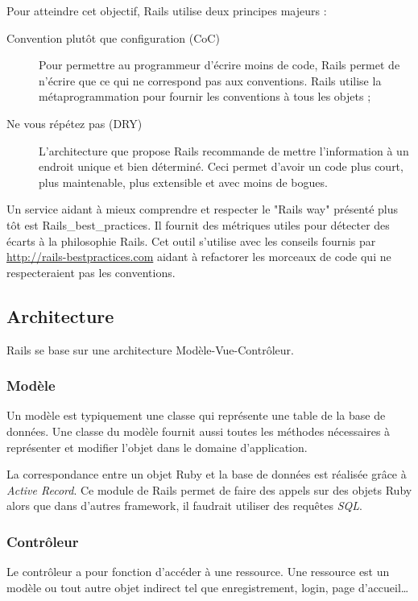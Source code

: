 Pour atteindre cet objectif, Rails utilise deux principes majeurs :
\begin{description}
  \item[Convention plutôt que configuration (CoC)] Pour permettre au programmeur d'écrire moins de code, Rails permet de n'écrire que ce qui ne correspond pas aux conventions. Rails utilise la métaprogrammation pour fournir les conventions à tous les objets ;
  \item[Ne vous répétez  pas (DRY)] L'architecture que propose Rails recommande de mettre l'information à un endroit unique et bien déterminé. Ceci permet d'avoir un code plus court, plus maintenable, plus extensible et avec moins de bogues.
\end{description}

Un service aidant à mieux comprendre et respecter le "Rails way" présenté plus tôt est Rails\_best\_practices. Il fournit des métriques utiles pour détecter des écarts à la philosophie Rails. Cet outil s'utilise avec les conseils fournis par \url{http://rails-bestpractices.com} aidant à refactorer les morceaux de code qui ne respecteraient pas les conventions.

\subsection{Architecture}
Rails se base sur une architecture Modèle-Vue-Contrôleur. %
\subsubsection{Modèle} 
Un modèle est typiquement une classe qui représente une table de la base de données. Une classe du modèle fournit aussi toutes les méthodes nécessaires à représenter et modifier l'objet dans le domaine d'application.

La correspondance entre un objet Ruby et la base de données est réalisée grâce à \textit{Active Record}. Ce module de Rails permet de faire des appels sur des objets Ruby alors que dans d'autres framework, il faudrait utiliser des requêtes \textit{SQL}. \label{active-record}
  
\subsubsection{Contrôleur}
\label{controleur}
Le contrôleur a pour fonction d'accéder à une ressource. Une ressource est un modèle ou tout autre objet indirect tel que enregistrement, login, page d'accueil\ldots  

